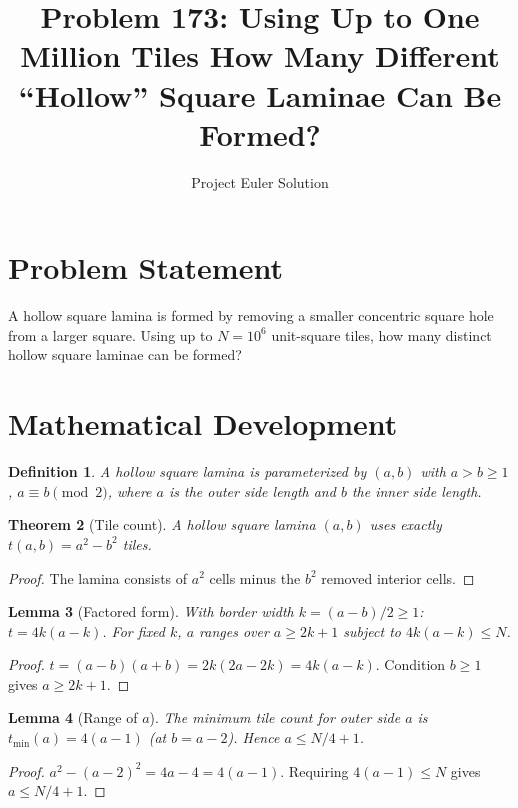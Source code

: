 \documentclass[11pt]{article}
\title{Problem 173: Using Up to One Million Tiles How Many Different\\``Hollow'' Square Laminae Can Be Formed?}
\author{Project Euler Solution}
\date{}
\newtheorem{theorem}{Theorem}
\newtheorem{lemma}[theorem]{Lemma}
\newtheorem{definition}[theorem]{Definition}
\begin{document}
\maketitle

\section{Problem Statement}

A hollow square lamina is formed by removing a smaller concentric square hole from a larger square. Using up to $N = 10^6$ unit-square tiles, how many distinct hollow square laminae can be formed?

\section{Mathematical Development}

\begin{definition}
A \emph{hollow square lamina} is parameterized by $(a,b)$ with $a > b \geq 1$, $a \equiv b \pmod{2}$, where $a$ is the outer side length and $b$ the inner side length.
\end{definition}

\begin{theorem}[Tile count]
A hollow square lamina $(a,b)$ uses exactly $t(a,b) = a^2 - b^2$ tiles.
\end{theorem}

\begin{proof}
The lamina consists of $a^2$ cells minus the $b^2$ removed interior cells.
\end{proof}

\begin{lemma}[Factored form]
With border width $k = (a{-}b)/2 \geq 1$: $t = 4k(a{-}k)$. For fixed $k$, $a$ ranges over $a \geq 2k{+}1$ subject to $4k(a{-}k) \leq N$.
\end{lemma}

\begin{proof}
$t = (a{-}b)(a{+}b) = 2k(2a{-}2k) = 4k(a{-}k)$. Condition $b \geq 1$ gives $a \geq 2k+1$.
\end{proof}

\begin{lemma}[Range of $a$]
The minimum tile count for outer side $a$ is $t_{\min}(a) = 4(a{-}1)$ (at $b = a{-}2$). Hence $a \leq N/4 + 1$.
\end{lemma}

\begin{proof}
$a^2 - (a{-}2)^2 = 4a - 4 = 4(a{-}1)$. Requiring $4(a{-}1) \leq N$ gives $a \leq N/4 + 1$.
\end{proof}
\end{document}
